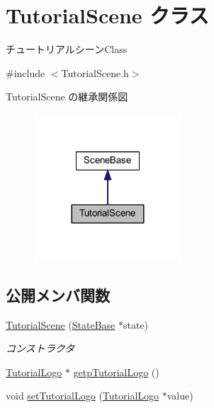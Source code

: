 \hypertarget{class_tutorial_scene}{}\section{Tutorial\+Scene クラス}
\label{class_tutorial_scene}


チュートリアルシーン\+Class  




{\ttfamily \#include $<$Tutorial\+Scene.\+h$>$}



Tutorial\+Scene の継承関係図\nopagebreak
\begin{figure}[H]
\begin{center}
\leavevmode
\includegraphics[width=156pt]{class_tutorial_scene__inherit__graph}
\end{center}
\end{figure}
\subsection*{公開メンバ関数}
\begin{DoxyCompactItemize}
\item 
\mbox{\hyperlink{class_tutorial_scene_a90f8c010bd72aa3dae61a5294fdfbeb7}{Tutorial\+Scene}} (\mbox{\hyperlink{class_scene_base_1_1_state_base}{State\+Base}} $\ast$state)
\begin{DoxyCompactList}\small\item\em コンストラクタ \end{DoxyCompactList}\item 
\mbox{\hyperlink{class_tutorial_logo}{Tutorial\+Logo}} $\ast$ \mbox{\hyperlink{class_tutorial_scene_a57c95d200431cec7839384f0228c831e}{getp\+Tutorial\+Logo}} ()
\item 
void \mbox{\hyperlink{class_tutorial_scene_a7c8b448ac848d4811e448acf45c5a48e}{set\+Tutorial\+Logo}} (\mbox{\hyperlink{class_tutorial_logo}{Tutorial\+Logo}} $\ast$value)
\end{DoxyCompactItemize}
